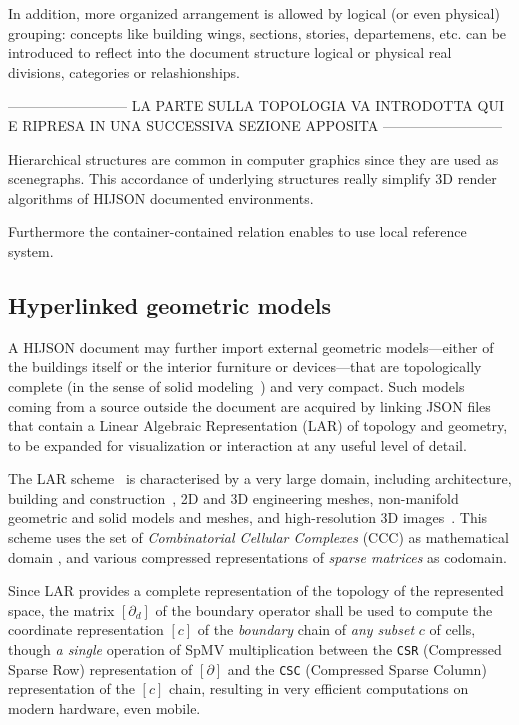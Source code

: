 \documentclass{sig-alternate}
\begin{document}
In addition, more organized arrangement is allowed by logical (or even physical) 
grouping: concepts like building wings, sections, stories, departemens, etc. can be 
introduced to reflect into the document structure logical or physical real divisions, 
categories or relashionships.

--------------------------
LA PARTE SULLA TOPOLOGIA VA INTRODOTTA QUI E RIPRESA IN UNA SUCCESSIVA SEZIONE APPOSITA
--------------------------

Hierarchical structures are common in computer graphics since they are used as 
scenegraphs. This accordance of underlying structures really simplify 3D render 
algorithms of HIJSON documented environments.

Furthermore the container-contained relation enables to use local reference system.

\subsection{Hyperlinked geometric models}\label{optional-lar}

A HIJSON document may further import external geometric models---either of the buildings itself or the interior furniture or devices---that are topologically complete (in the sense of solid modeling~\cite{Requicha:1980:RRS:356827.356833}) and very compact. 
Such models coming from a source outside the document are acquired by linking JSON files that contain a Linear Algebraic Representation (LAR) of topology and geometry, to be expanded for visualization or interaction at any useful level of detail. 

The LAR scheme~\cite{Dicarlo:2014:TNL:2543138.2543294} is characterised by a very large domain, including architecture, building and construction~\cite{paoluzziMS:2014}, 2D and 3D engineering meshes, non-manifold geometric and solid models and meshes, and high-resolution 3D images~\cite{cadanda:2015}. This scheme uses the set of \emph{Combinatorial Cellular Complexes} (CCC) as mathematical domain
\cite{Basak:2010}, and various compressed representations of \emph{sparse matrices} \cite{gemmexp} as codomain. 

Since LAR provides a complete representation of the topology of the represented space,
the matrix  $[\partial_d]$ of the boundary operator shall be used to compute the coordinate representation $[c]$ of the \emph{boundary} chain of \emph{any subset} $c$ of cells, though \emph{a single} operation of SpMV multiplication \cite{gemmexp} between the \texttt{CSR} (Compressed Sparse Row) representation of $[\partial]$ and the \texttt{CSC} (Compressed Sparse Column) representation of the $[c]$ chain, resulting in very efficient computations on modern hardware, even mobile.
\end{document}

